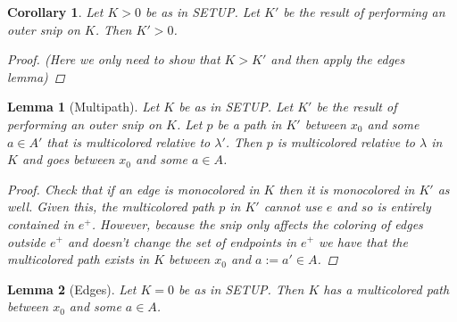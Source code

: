\documentclass{article}
\theoremstyle{mystyle}
\newtheorem{lem}{Lemma}[section]
\newtheorem*{cor*}{Corollary}
\theoremstyle{remark}
\begin{document}
\begin{cor*}
	Let \(K > 0\) be as in SETUP. Let \(K'\) be the result of performing an outer snip on \(K\). Then \(K' > 0\).
	\begin{proof}
        (Here we only need to show that \(K > K'\) and then apply the edges lemma)
		
	\end{proof}
\end{cor*}
\begin{lem}
	[Multipath]
	 \label{lem:multi} 
	Let \(K\) be as in SETUP. Let \(K'\) be the result of performing an outer snip on \(K\). Let \(p\) be a path in \(K'\) between \(x_{0}\) and some \(a \in A'\) that is {\em multicolored} relative to \(\lambda'\). Then \(p\) is multicolored relative to \(\lambda\) in \(K\) and goes between \(x_{0}\) and some \(a \in A\).
	\begin{proof}
		Check that if an edge is monocolored in \(K\) then it is monocolored in \(K'\) as well. Given this, the multicolored path \(p\) in \(K'\) cannot use \(e\) and so is entirely contained in \(e^{+}\). However, because the snip only affects the coloring of edges outside \(e^{+}\) and doesn't change the set of endpoints in \(e^{+}\) we have that the multicolored path exists in \(K\) between \(x_{0}\) and \(a:=a' \in A\).
	\end{proof}
\end{lem}
\begin{lem}
	[Edges]
	 \label{edges} 
	  Let \(K=0\) be as in SETUP. Then \(K\) has a multicolored path between \(x_{0}\) and some \(a \in A\).
\end{lem}
\end{document}
